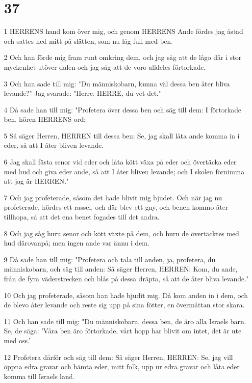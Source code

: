 \chapter{37}

\par 1 HERRENS hand kom över mig, och genom HERRENS Ande fördes jag åstad och sattes ned mitt på slätten, som nu låg full med ben.
\par 2 Och han förde mig fram runt omkring dem, och jag såg att de lågo där i stor myckenhet utöver dalen och jag såg att de voro alldeles förtorkade.
\par 3 Och han sade till mig: "Du människobarn, kunna väl dessa ben åter bliva levande?" Jag svarade: "Herre, HERRE, du vet det."
\par 4 Då sade han till mig: "Profetera över dessa ben och säg till dem: I förtorkade ben, hören HERRENS ord;
\par 5 Så säger Herren, HERREN till dessa ben: Se, jag skall låta ande komma in i eder, så att I åter bliven levande.
\par 6 Jag skall fästa senor vid eder och låta kött växa på eder och övertäcka eder med hud och giva eder ande, så att I åter bliven levande; och I skolen förnimma att jag är HERREN."
\par 7 Och jag profeterade, såsom det hade blivit mig bjudet. Och när jag nu profeterade, hördes ett rassel, och där blev ett gny, och benen kommo åter tillhopa, så att det ena benet fogades till det andra.
\par 8 Och jag såg huru senor och kött växte på dem, och huru de övertäcktes med hud därovanpå; men ingen ande var ännu i dem.
\par 9 Då sade han till mig: "Profetera och tala till anden, ja, profetera, du människobarn, och säg till anden: Så säger Herren, HERREN: Kom, du ande, från de fyra väderstrecken och blås på dessa dräpta, så att de åter bliva levande."
\par 10 Och jag profeterade, såsom han hade bjudit mig. Då kom anden in i dem, och de blevo åter levande och reste sig upp på sina fötter, en övermåttan stor skara.
\par 11 Och han sade till mig: "Du människobarn, dessa ben, de äro alla Israels barn. Se, de säga: 'Våra ben äro förtorkade, vårt hopp har blivit om intet, det är ute med oss.'
\par 12 Profetera därför och säg till dem: Så säger Herren, HERREN: Se, jag vill öppna edra gravar och hämta eder, mitt folk, upp ur edra gravar och låta eder komma till Israels land.
